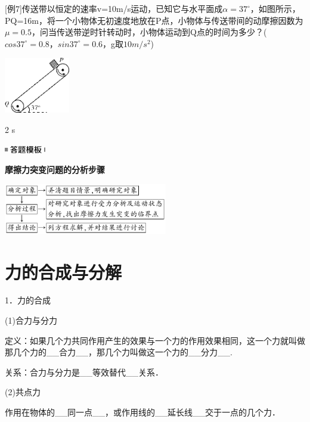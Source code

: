 {[}例7{]}传送带以恒定的速率v=10m/s运动，已知它与水平面成$\alpha=37^\circ$，如图所示，PQ=16m，将一个小物体无初速度地放在P点，小物体与传送带间的动摩擦因数为$\mu=0.5$，问当传送带逆时针转动时，小物体运动到Q点的时间为多少？($cos37^\circ=0.8，sin 37^\circ=0.6$，g取$10 m/s^2$)

\begin{center}\includegraphics[width=1.125in,height=0.95833in]{media/image53.png}\end{center}

\begin{solution}
	2 s
\end{solution}
\begin{center}\includegraphics[width=0.70833in,height=0.125in]{media/image25.png}\end{center}
\begin{center}
	\textbf{摩擦力突变问题的分析步骤}
\end{center}

\begin{center}\includegraphics[width=2.8125in,height=0.875in]{media/image54.png}\end{center}

\newpage
\section{力的合成与分解}

1．力的合成

(1)合力与分力

定义：如果几个力共同作用产生的效果与一个力的作用效果相同，这一个力就叫做那几个力的\_\_合力\_\_，那几个力叫做这一个力的\_\_分力\_\_.

关系：合力与分力是\_\_等效替代\_\_关系．

(2)共点力

作用在物体的\_\_同一点\_\_，或作用线的\_\_延长线\_\_交于一点的几个力．


